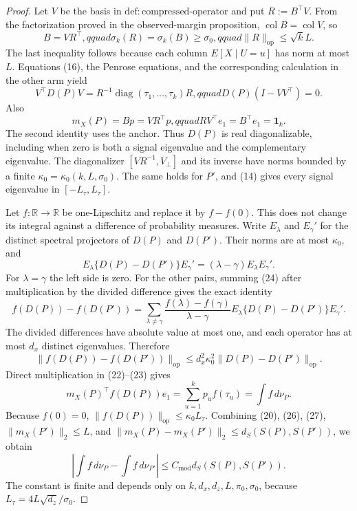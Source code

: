 \documentclass{article}
\begin{document}
\begin{proof}
Let \(V\) be the basis in \(\mathrm{def:compressed\text{-}operator}\) and put \(R:=B^\top V\).  From the factorization proved in the observed-margin proposition, \(\operatorname{col}B=\operatorname{col}V\), so
\[
B=VR^\top,qquad \sigma_k(R)=\sigma_k(B)\ge\sigma_0,qquad
\lVert R\rVert_{\mathrm{op}}\le\sqrt{k}L.                                   \tag{21}
\]
The last inequality follows because each column \(E[X\mid U=u]\) has norm at most \(L\).  Equations (16), the Penrose equations, and the corresponding calculation in the other arm yield
\[
V^\top D(P)V=R^{-1}\operatorname{diag}(\tau_1,\ldots,\tau_k)R,qquad
D(P)(I-VV^\top)=0.                                                             \tag{22}
\]
Also
\[
m_X(P)=Bp=VR^\top p,qquad RV^\top e_1=B^\top e_1=\mathbf1_k.                 \tag{23}
\]
The second identity uses the anchor.  Thus \(D(P)\) is real diagonalizable, including when zero is both a signal eigenvalue and the complementary eigenvalue.  The diagonalizer \([VR^{-1},V_\perp]\) and its inverse have norms bounded by a finite \(\kappa_0=\kappa_0(k,L,\sigma_0)\).  The same holds for \(P'\), and (14) gives every signal eigenvalue in \([-L_{\tau},L_{\tau}]\).

Let \(f:\mathbb R\to\mathbb R\) be one-Lipschitz and replace it by \(f-f(0)\).  This does not change its integral against a difference of probability measures.  Write \(E_\lambda\) and \(E_\gamma'\) for the distinct spectral projectors of \(D(P)\) and \(D(P')\).  Their norms are at most \(\kappa_0\), and
\[
E_\lambda\{D(P)-D(P')\}E_\gamma'=(\lambda-\gamma)E_\lambda E_\gamma'.       \tag{24}
\]
For \(\lambda=\gamma\) the left side is zero.  For the other pairs, summing (24) after multiplication by the divided difference gives the exact identity
\[
f(D(P))-f(D(P'))=
\sum_{\lambda\ne\gamma}
\frac{f(\lambda)-f(\gamma)}{\lambda-\gamma}
E_\lambda\{D(P)-D(P')\}E_\gamma'.                                           \tag{25}
\]
The divided differences have absolute value at most one, and each operator has at most \(d_x\) distinct eigenvalues.  Therefore
\[
\lVert f(D(P))-f(D(P'))\rVert_{\mathrm{op}}
\le d_x^2\kappa_0^2\lVert D(P)-D(P')\rVert_{\mathrm{op}}.                    \tag{26}
\]
Direct multiplication in (22)--(23) gives
\[
m_X(P)^\top f(D(P))e_1=\sum_{u=1}^kp_uf(\tau_u)=\int f\,d\nu_P.              \tag{27}
\]
Because \(f(0)=0\), \(\lVert f(D(P))\rVert_{\mathrm{op}}\le\kappa_0L_{\tau}\).  Combining (20), (26), (27), \(\lVert m_X(P')\rVert_2\le L\), and
\(\lVert m_X(P)-m_X(P')\rVert_2\le d_S(S(P),S(P'))\), we obtain
\[
\left|\int f\,d\nu_P-\int f\,d\nu_{P'}\right|
\le C_{\mathrm{mod}}d_S(S(P),S(P')).                                         \tag{28}
\]
The constant is finite and depends only on \(k,d_x,d_z,L,\pi_0,\sigma_0\), because \(L_{\tau}=4L\sqrt{d_z}/\sigma_0\).


\end{proof}
\end{document}
